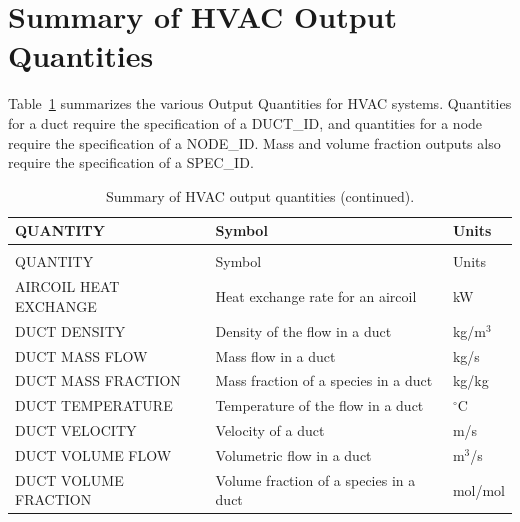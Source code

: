 \documentclass[11pt]{book}
\begin{document}
\clearpage
\section{Summary of HVAC Output Quantities}
\label{info:hvacoutputquantities}

Table~\ref{tab:hvacoutput} summarizes the various Output Quantities for HVAC systems.  Quantities for a duct require the specification
of a {\ct DUCT\_ID}, and quantities for a node require the specification of a {\ct NODE\_ID}.  Mass and volume fraction outputs also require the specification of a {\ct SPEC\_ID}.

\begin{longtable}{|l|l|l|@{\extracolsep{\fill}}}
\caption[HVAC output quantities]{Summary of HVAC output quantities.}
\label{tab:hvacoutput} \\
\hline
{\ct QUANTITY}                                  & Symbol                                    & Units           \\
\hline \hline
\endfirsthead
\caption[]{Summary of HVAC output quantities (continued).} \\
\hline
{\ct QUANTITY}                                  & Symbol                                    & Units           \\
\hline \hline
\endhead
{\ct AIRCOIL HEAT EXCHANGE}                     & Heat exchange rate for an aircoil         &  kW                   \\ \hline
{\ct DUCT DENSITY}                              & Density of the flow in a duct             &  kg/m$^3$             \\ \hline
{\ct DUCT MASS FLOW}                            & Mass flow in a duct                       &  kg/s                 \\ \hline
{\ct DUCT MASS FRACTION}                        & Mass fraction of a species in a duct      &  kg/kg                \\ \hline
{\ct DUCT TEMPERATURE}                          & Temperature of the flow in a duct         & $^\circ$C             \\ \hline
{\ct DUCT VELOCITY}                             & Velocity of a duct                        &  m/s                  \\ \hline
{\ct DUCT VOLUME FLOW}                          & Volumetric flow in a duct                 &  m$^3$/s              \\ \hline
{\ct DUCT VOLUME FRACTION}                      & Volume fraction of a species in a duct    &  mol/mol              \\ \hline

\end{longtable}
\end{document}
